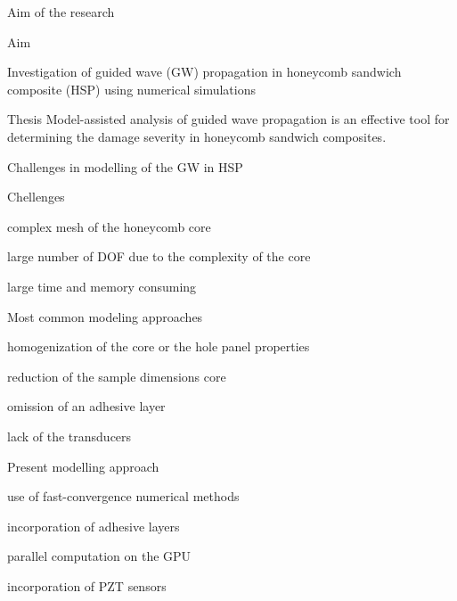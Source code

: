 \documentclass[10pt]{beamer} %
\begin{document}
	\begin{frame}[label=frame3]{Aim of the research}

		\begin{block}{Aim}

			Investigation of guided wave (GW) propagation in honeycomb sandwich composite (HSP) using numerical simulations

		\end{block}
		\begin{alertblock}{Thesis}
				Model-assisted analysis of guided wave propagation is an effective tool for determining the damage severity in honeycomb sandwich composites.
		\end{alertblock}

	\end{frame}

	
	\begin{frame}[label=frame4]{Challenges in modelling of the GW in HSP}

		\begin{block}{Chellenges}
			\begin{itemize}

				\small{
				\item complex mesh of the honeycomb core

				\item large number of DOF due to the complexity of the core

				\item large time and memory consuming}
			\end{itemize}

		\end{block}

		\begin{block}{Most common modeling approaches}

			\begin{itemize}
				\small{
				\item homogenization of the core or the hole panel properties
				\item reduction of the sample dimensions core
				\item omission of an adhesive layer
				\item lack of the transducers}
			\end{itemize}
		\end{block}

		\begin{block}{Present modelling approach}
			\begin{itemize}
				\small{
				\item use of fast-convergence numerical methods
				\item incorporation of adhesive layers
				\item parallel computation on the GPU
				\item incorporation of PZT sensors}
			\end{itemize}
		\end{block}

		
	\end{frame}
\end{document}
